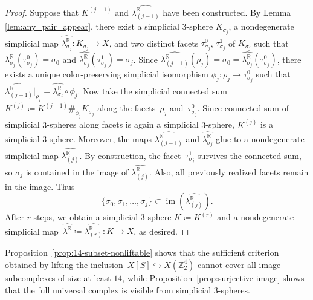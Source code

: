 \documentclass{amsart}
\newcommand{\Z}{\mathbb{Z}}
\newcommand{\R}{\mathbb{R}}
\theoremstyle{definition}
\theoremstyle{remark}
\begin{document}
\begin{proof}
    Suppose that $K^{(j-1)}$ and $\widehat{\lambda^{\R}_{(j-1)}}$ have been constructed. 
    By Lemma \ref{lem:any_pair_appear}, there exist a simplicial 3-sphere $K_{\sigma_j}$, a nondegenerate simplicial map $\widehat{\lambda^{\R}_{\sigma_j}}: K_{\sigma_j}\to X$, and two distinct facets $\tau_{\sigma_j}^0$, $\tau_{\sigma_j}^1$ of $K_{\sigma_j}$ such that $\widehat{\lambda^{\R}_{\sigma_j}}(\tau_{\sigma_j}^0) = \sigma_0$ and $\widehat{\lambda^{\R}_{\sigma_j}}(\tau_{\sigma_j}^1) = \sigma_j$.
    Since $\widehat{\lambda^{\R}_{(j-1)}}(\rho_j)=\sigma_0= \widehat{\lambda^{\R}_{\sigma_j}}(\tau_{\sigma_j}^0)$, there exists a unique color-preserving simplicial isomorphism $\phi_j\colon \rho_j\to \tau_{\sigma_j}^0$ such that $\widehat{\lambda^{\R}_{(j-1)}}\big|_{\rho_j} = \widehat{\lambda^{\R}_{\sigma_j}}\circ \phi_j$.
    Now take the simplicial connected sum $K^{(j)}\coloneq K^{(j-1)}\#_{\phi_j} K_{\sigma_j}$ along the facets~$\rho_j$ and~$\tau_{\sigma_j}^0$. 
    Since connected sum of simplicial $3$-spheres along facets is again a simplicial $3$-sphere, $K^{(j)}$ is a simplicial $3$-sphere. 
    Moreover, the maps $ \widehat{\lambda^{\R}_{(j-1)}}$ and $\widehat{\lambda^{\R}_{\sigma_j}}$ glue to a nondegenerate simplicial map $\widehat{\lambda^{\R}_{(j)}}$. 
    By construction, the facet~$\tau_{\sigma_j}^1$ survives the connected sum, so $\sigma_j$ is contained in the image of $\widehat{\lambda^{\R}_{(j)}}$. 
    Also, all previously realized facets remain in the image. 
    Thus 
    $$
        \{\sigma_0,\sigma_1,\dots,\sigma_j\}\subset \operatorname{im}(\widehat{\lambda^{\R}_{(j)}}).
    $$
    After $r$ steps, we obtain a simplicial $3$-sphere $K\coloneq K^{(r)}$ and a nondegenerate simplicial map~$\widehat{\lambda^{\R}} \coloneq \widehat{\lambda^{\R}_{(r)}}\colon K\to X$, as desired.
\end{proof}

Proposition~\ref{prop:14-subset-nonliftable} shows that the sufficient criterion obtained by lifting the inclusion~$X[S] \hookrightarrow X(\Z_2^4)$ cannot cover all image subcomplexes of size at least $14$, while Proposition~\ref{prop:surjective-image} shows that the full universal complex is visible from simplicial $3$-spheres.
\end{document}
